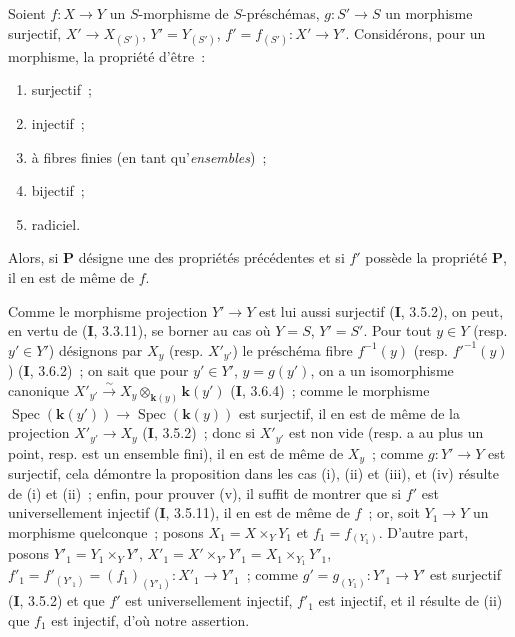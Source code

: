 \begin{proposition}[2.6.1]
Soient $f:X\to Y$ un $S$-morphisme de $S$-préschémas, $g:S'\to S$ un
morphisme surjectif, $X'\to X_{(S')}$, $Y'=Y_{(S')}$,
$f'=f_{(S')}:X'\to Y'$. Considérons, pour un morphisme, la propriété d'être~:
\begin{enumerate}
\item[\textup{(i)}] surjectif~;
\item[\textup{(ii)}] injectif~;
\item[\textup{(iii)}] à fibres finies \textup{(en tant qu'\emph{ensembles})}~;
\item[\textup{(iv)}] bijectif~;
\item[\textup{(v)}] radiciel.
\end{enumerate}
Alors, si $\boldsymbol{P}$ désigne une des propriétés précédentes et si $f'$ possède la
propriété $\boldsymbol{P}$, il en est de même de $f$.
\end{proposition}

Comme le morphisme projection $Y'\to Y$ est lui aussi surjectif (\textbf{I}, 3.5.2),
on peut, en vertu de (\textbf{I}, 3.3.11), se borner au cas où $Y=S$, $Y'=S'$. Pour
tout $y\in Y$ (resp. $y'\in Y'$) désignons par $X_y$ (resp. $X'_{y'}$) le
préschéma fibre $f^{-1}(y)$ (resp. $f'^{-1}(y)$) (\textbf{I}, 3.6.2)~; on sait que
pour $y'\in Y'$, $y=g(y')$, on a un isomorphisme canonique $X'_{y'}\xrightarrow{\sim}X_y\otimes_{\mathbf{k}(y)}\boldsymbol{k}(y')$ (\textbf{I}, 3.6.4)~;
comme le morphisme $\operatorname{Spec}(\boldsymbol{k}(y'))\to\operatorname{Spec}(\boldsymbol{k}(y))$
est surjectif, il en est de même de la projection $X'_{y'}\to X_y$
(\textbf{I}, 3.5.2)~; donc si $X'_{y'}$ est non vide (resp. a au plus un point, resp.
est un ensemble fini), il en est de même de $X_y$~; comme $g:Y'\to Y$ est
surjectif, cela démontre la proposition dans les cas (i), (ii) et (iii), et
(iv) résulte de (i) et (ii)~; enfin, pour prouver (v), il suffit de montrer
que si $f'$ est universellement injectif (\textbf{I}, 3.5.11), il en est de même de
$f$~; or, soit $Y_1\to Y$ un morphisme quelconque~; posons
$X_1=X\times_Y Y_1$ et $f_1=f_{(Y_1)}$. D'autre part, posons $Y'_1=Y_1\times_Y Y'$, $X'_1=X'\times_{Y'}Y'_1=X_1\times_{Y_1}Y'_1$, $f'_1=f'_{(Y'_1)}=(f_1)_{(Y'_1)}:X'_1\to Y'_1$~;
comme $g'=g_{(Y_1)}:Y'_1\to Y'$ est surjectif (\textbf{I}, 3.5.2) et que $f'$ est
universellement injectif, $f'_1$ est injectif, et il résulte de (ii) que
$f_1$ est injectif, d'où notre assertion.

